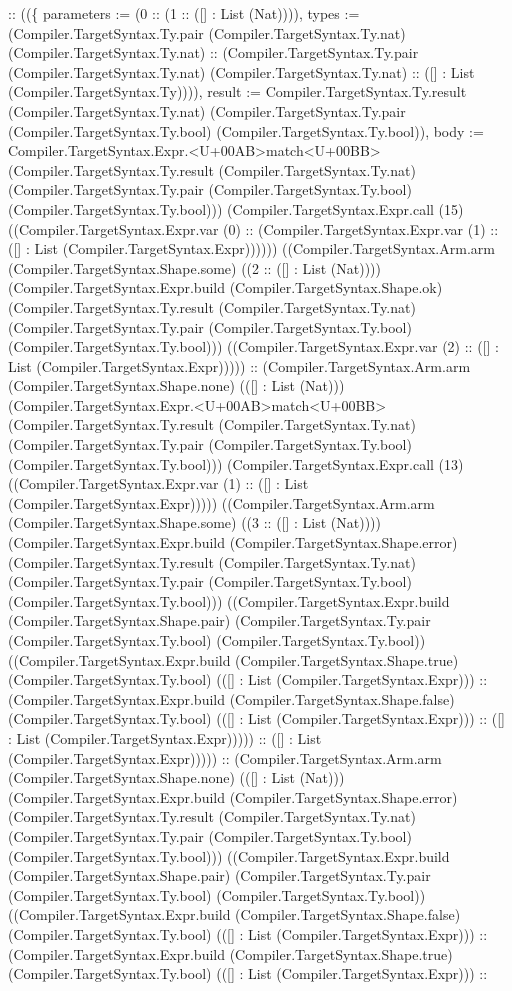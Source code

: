 \documentclass[11pt]{article}
\begin{document}
:: ((\{ parameters := (0 :: (1 :: ([] : List (Nat)))), types := (Compiler.TargetSyntax.Ty.pair (Compiler.TargetSyntax.Ty.nat) (Compiler.TargetSyntax.Ty.nat) :: (Compiler.TargetSyntax.Ty.pair (Compiler.TargetSyntax.Ty.nat) (Compiler.TargetSyntax.Ty.nat) :: ([] : List (Compiler.TargetSyntax.Ty)))), result := Compiler.TargetSyntax.Ty.result (Compiler.TargetSyntax.Ty.nat) (Compiler.TargetSyntax.Ty.pair (Compiler.TargetSyntax.Ty.bool) (Compiler.TargetSyntax.Ty.bool)), body := Compiler.TargetSyntax.Expr.<U+00AB>match<U+00BB> (Compiler.TargetSyntax.Ty.result (Compiler.TargetSyntax.Ty.nat) (Compiler.TargetSyntax.Ty.pair (Compiler.TargetSyntax.Ty.bool) (Compiler.TargetSyntax.Ty.bool))) (Compiler.TargetSyntax.Expr.call (15) ((Compiler.TargetSyntax.Expr.var (0) :: (Compiler.TargetSyntax.Expr.var (1) :: ([] : List (Compiler.TargetSyntax.Expr)))))) ((Compiler.TargetSyntax.Arm.arm (Compiler.TargetSyntax.Shape.some) ((2 :: ([] : List (Nat)))) (Compiler.TargetSyntax.Expr.build (Compiler.TargetSyntax.Shape.ok) (Compiler.TargetSyntax.Ty.result (Compiler.TargetSyntax.Ty.nat) (Compiler.TargetSyntax.Ty.pair (Compiler.TargetSyntax.Ty.bool) (Compiler.TargetSyntax.Ty.bool))) ((Compiler.TargetSyntax.Expr.var (2) :: ([] : List (Compiler.TargetSyntax.Expr))))) :: (Compiler.TargetSyntax.Arm.arm (Compiler.TargetSyntax.Shape.none) (([] : List (Nat))) (Compiler.TargetSyntax.Expr.<U+00AB>match<U+00BB> (Compiler.TargetSyntax.Ty.result (Compiler.TargetSyntax.Ty.nat) (Compiler.TargetSyntax.Ty.pair (Compiler.TargetSyntax.Ty.bool) (Compiler.TargetSyntax.Ty.bool))) (Compiler.TargetSyntax.Expr.call (13) ((Compiler.TargetSyntax.Expr.var (1) :: ([] : List (Compiler.TargetSyntax.Expr))))) ((Compiler.TargetSyntax.Arm.arm (Compiler.TargetSyntax.Shape.some) ((3 :: ([] : List (Nat)))) (Compiler.TargetSyntax.Expr.build (Compiler.TargetSyntax.Shape.error) (Compiler.TargetSyntax.Ty.result (Compiler.TargetSyntax.Ty.nat) (Compiler.TargetSyntax.Ty.pair (Compiler.TargetSyntax.Ty.bool) (Compiler.TargetSyntax.Ty.bool))) ((Compiler.TargetSyntax.Expr.build (Compiler.TargetSyntax.Shape.pair) (Compiler.TargetSyntax.Ty.pair (Compiler.TargetSyntax.Ty.bool) (Compiler.TargetSyntax.Ty.bool)) ((Compiler.TargetSyntax.Expr.build (Compiler.TargetSyntax.Shape.true) (Compiler.TargetSyntax.Ty.bool) (([] : List (Compiler.TargetSyntax.Expr))) :: (Compiler.TargetSyntax.Expr.build (Compiler.TargetSyntax.Shape.false) (Compiler.TargetSyntax.Ty.bool) (([] : List (Compiler.TargetSyntax.Expr))) :: ([] : List (Compiler.TargetSyntax.Expr))))) :: ([] : List (Compiler.TargetSyntax.Expr))))) :: (Compiler.TargetSyntax.Arm.arm (Compiler.TargetSyntax.Shape.none) (([] : List (Nat))) (Compiler.TargetSyntax.Expr.build (Compiler.TargetSyntax.Shape.error) (Compiler.TargetSyntax.Ty.result (Compiler.TargetSyntax.Ty.nat) (Compiler.TargetSyntax.Ty.pair (Compiler.TargetSyntax.Ty.bool) (Compiler.TargetSyntax.Ty.bool))) ((Compiler.TargetSyntax.Expr.build (Compiler.TargetSyntax.Shape.pair) (Compiler.TargetSyntax.Ty.pair (Compiler.TargetSyntax.Ty.bool) (Compiler.TargetSyntax.Ty.bool)) ((Compiler.TargetSyntax.Expr.build (Compiler.TargetSyntax.Shape.false) (Compiler.TargetSyntax.Ty.bool) (([] : List (Compiler.TargetSyntax.Expr))) :: (Compiler.TargetSyntax.Expr.build (Compiler.TargetSyntax.Shape.true) (Compiler.TargetSyntax.Ty.bool) (([] : List (Compiler.TargetSyntax.Expr))) :: 
\end{document}
